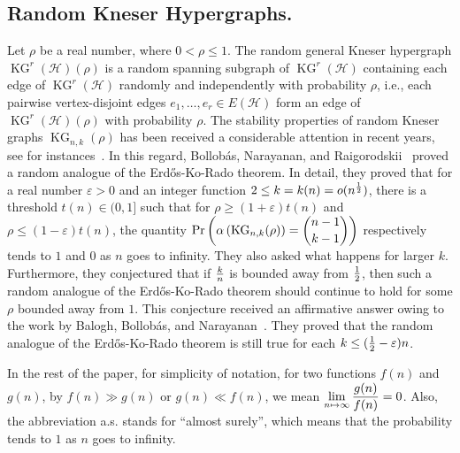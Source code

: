 \documentclass[11pt]{amsart}
\theoremstyle{definition}
\theoremstyle{remark}
\def\ds{\displaystyle}
\def\KG{\operatorname{KG}}
\begin{document}
\subsection{\bf Random Kneser Hypergraphs.}
Let $\rho$ be a real number, where $0<\rho\leq 1$. The random general Kneser hypergraph 
$\KG^r(\mathcal{H})(\rho)$ is a random spanning subgraph of $\KG^r(\mathcal{H})$ containing each edge 
of $\KG^r(\mathcal{H})$ randomly and independently with probability $\rho$, i.e., each pairwise vertex-disjoint edges $e_1,\ldots,e_r\in E(\mathcal{H})$ 
form an edge of $\KG^r(\mathcal{H})(\rho)$ with probability $\rho$. 
The stability properties of random Kneser graphs $\KG_{n,k}(\rho)$  
has been received a considerable 
attention in recent years, see for instances~\cite{MR3482268,MR3403515}. 
In this regard, Bollob{\'a}s, Narayanan,  and Raigorodskii~\cite{MR3403515}
proved a random analogue of the Erd\H{o}s-Ko-Rado theorem. In detail, 
they proved that 
for a real number $\varepsilon>0$ and an integer function $2\leq k=k(n)=o(n^{1\over 2})$, 
there is a threshold $t(n)\in (0,1]$ such that for $\rho\geq (1+\varepsilon)t(n)$
and $\rho\leq (1-\varepsilon)t(n)$, the quantity $\ds{\rm Pr}\left(\alpha\left(\KG_{n,k}(\rho)\right)={n-1\choose k-1}\right)$ respectively tends to $1$ and $0$ as $n$ goes to infinity. 
They also asked what happens for larger $k$. Furthermore, they conjectured that if
${k\over n}$ is bounded away from ${1\over 2}$, then such a random analogue of the Erd\H{o}s-Ko-Rado theorem should continue to hold for some $\rho$ bounded away from $1$.
This conjecture received an affirmative answer owing to the work by 
Balogh, Bollob{\'a}s, and Narayanan~\cite{MR3482268}. They proved that the 
random analogue of the Erd\H{o}s-Ko-Rado theorem is still true for 
each $k\leq ({1\over 2}-\varepsilon)n$.

In the rest of the paper, for simplicity of notation, for two functions $f(n)$ and $g(n)$, 
by $f(n)\gg g(n)$ or $g(n)\ll f(n)$, we mean $\ds\lim_{n\mapsto\infty} {g(n)\over f(n)}=0$.
Also, the abbreviation a.s. stands for ``almost surely'', which means that the probability tends to $1$ as $n$ goes to infinity.
\end{document}
